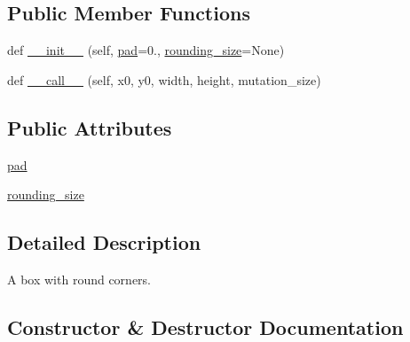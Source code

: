 \subsection*{Public Member Functions}
\begin{DoxyCompactItemize}
\item 
def \hyperlink{classmatplotlib_1_1patches_1_1BoxStyle_1_1Round_a1facea8259e101c53008d38b893bed5e}{\+\_\+\+\_\+init\+\_\+\+\_\+} (self, \hyperlink{classmatplotlib_1_1patches_1_1BoxStyle_1_1Round_a76a455364be1f09c01e52b1ce2d941e5}{pad}=0., \hyperlink{classmatplotlib_1_1patches_1_1BoxStyle_1_1Round_a46b985c92ac0d09e0250793f00c7e0d6}{rounding\+\_\+size}=None)
\item 
def \hyperlink{classmatplotlib_1_1patches_1_1BoxStyle_1_1Round_ac408f6e20871b1ba5c12cedf08463130}{\+\_\+\+\_\+call\+\_\+\+\_\+} (self, x0, y0, width, height, mutation\+\_\+size)
\end{DoxyCompactItemize}
\subsection*{Public Attributes}
\begin{DoxyCompactItemize}
\item 
\hyperlink{classmatplotlib_1_1patches_1_1BoxStyle_1_1Round_a76a455364be1f09c01e52b1ce2d941e5}{pad}
\item 
\hyperlink{classmatplotlib_1_1patches_1_1BoxStyle_1_1Round_a46b985c92ac0d09e0250793f00c7e0d6}{rounding\+\_\+size}
\end{DoxyCompactItemize}


\subsection{Detailed Description}
\begin{DoxyVerb}A box with round corners.\end{DoxyVerb}
 

\subsection{Constructor \& Destructor Documentation}
\mbox{\label{classmatplotlib_1_1patches_1_1BoxStyle_1_1Round_a1facea8259e101c53008d38b893bed5e}} 
